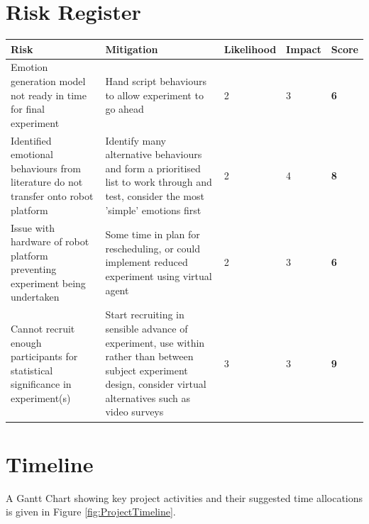 \documentclass[11pt]{article}
\begin{document}
\section{Risk Register}
\begin{center}
	\begin{tabular}{|m{6cm}|m{5cm}|m{1.8cm}|m{1cm}|m{1cm}|}
		\hline
		Risk & Mitigation & Likelihood & Impact & \textbf{Score} \\
		\hline
		Emotion generation model not ready in time for final experiment & Hand script behaviours to allow experiment to go ahead & 2 & 3 & \textbf{6} \\ 
		\hline
		Identified emotional behaviours from literature do not transfer onto robot platform & Identify many alternative behaviours and form a prioritised list to work through and test, consider the most 'simple' emotions first & 2 & 4 & \textbf{8} \\ 
		\hline 
		Issue with hardware of robot platform preventing experiment being undertaken & Some time in plan for rescheduling, or could implement reduced experiment using virtual agent & 2 & 3 & \textbf{6} \\
		\hline 
		Cannot recruit enough participants for statistical significance in experiment(s) & Start recruiting in sensible advance of experiment, use within rather than between subject experiment design, consider virtual alternatives such as video surveys & 3 & 3 & \textbf{9} \\
		\hline
	\end{tabular} 
\end{center}

\section{Timeline}
A Gantt Chart showing key project activities and their suggested time allocations is given in Figure \ref{fig:ProjectTimeline}. 
\end{document}
